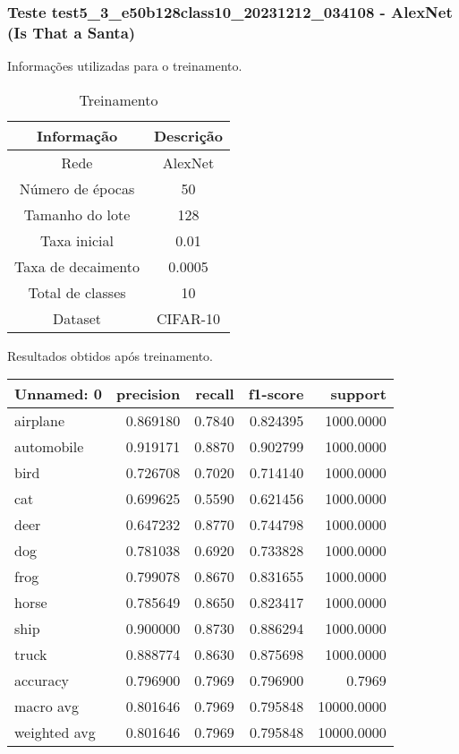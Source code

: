 \subsubsection{Teste test5_3_e50b128class10_20231212_034108 - AlexNet (Is That a Santa)}

Informações utilizadas para o treinamento.

\begin{table}[ht]
   \centering
   \caption{Treinamento}
   \label{tab:modelos}
   \begin{tabular}{| c | c | }
      \hline 
      \textbf{Informação} & \textbf{Descrição} \\
      \hline \hline 
      Rede & AlexNet \\
      \hline
      Número de épocas & 50\\
      \hline
      Tamanho do lote & 128\\
      \hline
      Taxa inicial & 0.01 \\
      \hline
      Taxa de decaimento & 0.0005 \\
      \hline
      Total de classes & 10\\
      \hline
      Dataset & CIFAR-10\\
      \hline
   \end{tabular} 
\end{table}

Resultados obtidos após treinamento.

\begin{tabular}{lrrrr}
\toprule
  Unnamed: 0 &  precision &  recall &  f1-score &    support \\
\midrule
    airplane &   0.869180 &  0.7840 &  0.824395 &  1000.0000 \\
  automobile &   0.919171 &  0.8870 &  0.902799 &  1000.0000 \\
        bird &   0.726708 &  0.7020 &  0.714140 &  1000.0000 \\
         cat &   0.699625 &  0.5590 &  0.621456 &  1000.0000 \\
        deer &   0.647232 &  0.8770 &  0.744798 &  1000.0000 \\
         dog &   0.781038 &  0.6920 &  0.733828 &  1000.0000 \\
        frog &   0.799078 &  0.8670 &  0.831655 &  1000.0000 \\
       horse &   0.785649 &  0.8650 &  0.823417 &  1000.0000 \\
        ship &   0.900000 &  0.8730 &  0.886294 &  1000.0000 \\
       truck &   0.888774 &  0.8630 &  0.875698 &  1000.0000 \\
    accuracy &   0.796900 &  0.7969 &  0.796900 &     0.7969 \\
   macro avg &   0.801646 &  0.7969 &  0.795848 & 10000.0000 \\
weighted avg &   0.801646 &  0.7969 &  0.795848 & 10000.0000 \\
\bottomrule
\end{tabular}


